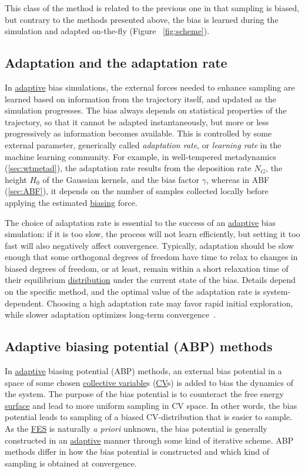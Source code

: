 \documentclass[9pt,review]{livecoms}
\begin{document}
This class of the method is related to the previous one in that sampling is biased, but contrary to the methods presented above, the bias is learned during the simulation and adapted on-the-fly (Figure ~\ref{fig:scheme}).

\subsection{Adaptation and the adaptation rate}

In \hyperlink{ref:Adaptive} {adaptive} bias simulations, the external forces needed to enhance sampling are learned based on information from the trajectory itself, and updated as the simulation progresses.
The bias always depends on statistical properties of the trajectory, so that it cannot be adapted instantaneously, but more or less progressively as information becomes available.
This is controlled by some external parameter, generically called \emph{adaptation rate}, or \emph{learning rate} in the machine learning community.
For example, in well-tempered metadynamics (\ref{sec:wtmetad}), the adaptation rate results from the deposition rate $N_G$, the height $H_0$ of the Gaussian kernels, and the bias factor $\gamma$, whereas in ABF (\ref{sec:ABF}), it depends on the number of samples collected locally before applying the estimated \hyperlink{ref:biasingE} {biasing} force.

The choice of adaptation rate is essential to the success of an \hyperlink{ref:Adaptive} {adaptive} bias simulation: if it is too slow, the process will not learn efficiently, but setting it too fast will also negatively affect convergence.
Typically, adaptation should be slow enough that some orthogonal degrees of freedom have time to relax to changes in biased degrees of freedom, or at least, remain within a short relaxation time of their equilibrium \hyperlink{ref:Distribution} {distribution}  under the current state of the bias. Details depend on the specific method, and the optimal value of the adaptation rate is system-dependent.
Choosing a high adaptation rate may favor rapid initial exploration, while slower adaptation optimizes long-term convergence~\cite{Invernizzi2022}.


\subsection{Adaptive biasing potential (ABP) methods}
\label{sec:ABP}
In \hyperlink{ref:Adaptive} {adaptive} biasing potential (ABP) methods, an external bias potential in a space of some chosen \hyperlink{ref:CV} {collective variable}s (\hyperlink{ref:CV} {CV}s) is added to bias the dynamics of the system. The purpose of the bias potential is to counteract the free energy \hyperlink{ref:FES} {surface} and lead to more uniform sampling in CV space. In other words, the bias potential leads to sampling of a biased CV-distribution that is easier to sample. As the \hyperlink{ref:FES} {FES} is naturally \textit{a priori} unknown, the bias potential is generally constructed in an \hyperlink{ref:Adaptive} {adaptive} manner through some kind of iterative scheme. ABP methods  differ in how the bias potential is constructed and which kind of sampling is obtained at convergence.
\end{document}
